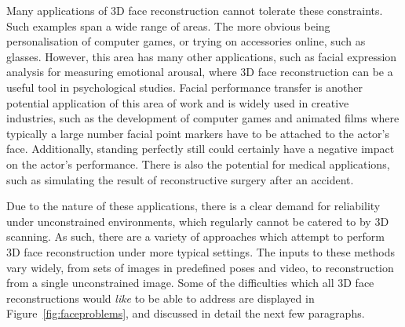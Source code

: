 Many applications of 3D face reconstruction cannot tolerate these
constraints. Such examples span a wide range of areas. The more
obvious being personalisation of computer games, or trying on
accessories online, such as glasses. However, this area has many other
applications, such as facial expression analysis for measuring
emotional arousal, where 3D face reconstruction can be a useful tool
in psychological studies. Facial performance transfer is another
potential application of this area of work and is widely used in
creative industries, such as the development of computer games and
animated films where typically a large number facial point markers
have to be attached to the actor's face. Additionally, standing
perfectly still could certainly have a negative impact on the actor's
performance. There is also the potential for medical applications,
such as simulating the result of reconstructive surgery after an
accident.

Due to the nature of these applications, there is a clear demand for
reliability under unconstrained environments, which regularly cannot
be catered to by 3D scanning. As such, there are a variety of
approaches which attempt to perform 3D face reconstruction under more
typical settings. The inputs to these methods vary widely, from sets
of images in predefined poses and video, to reconstruction from a
single unconstrained image. Some of the difficulties which all 3D face
reconstructions would \textit{like} to be able to address are
displayed in Figure~\ref{fig:faceproblems}, and discussed in detail
the next few paragraphs.


